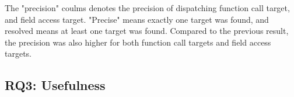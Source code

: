The "precision" coulms denotes the precision of dispatching function call
target, and field access target.  "Precise" means exactly one target was found,
and resolved means at least one target was found.  Compared to the previous
result, the precision was also higher for both function call targets and field
access targets.

\subsection{RQ3: Usefulness}

